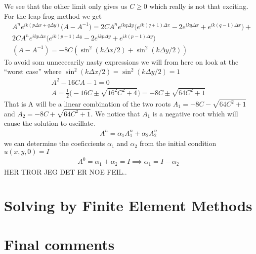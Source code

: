 \documentclass[a4paper,english, 10pt, twoside]{article}
\begin{document}
We see that the other limit only gives us $C\geq 0$ which really is not that exciting. \\
For the leap frog method we get
\begin{align*}
  &A^ne^{ik(p\Delta x +q\Delta y)}\big(A-A^{-1}\big) = 2CA^ne^{ikq\Delta y}\big(e^{ik(q+1)\Delta x} -2e^{ikq\Delta x}+
  e^{ik(q-1)\Delta x}\big)+\\
 &2CA^ne^{ikp\Delta x}\big(e^{ik(p+1)\Delta y} -2e^{ikp\Delta y} +e^{ik(p-1)\Delta y}\big) \\
 &(A-A^{-1}) = -8C(\sin^2(k\Delta x/2)+ \sin^2(k\Delta y/2))
\end{align*}
To avoid som unnececarily nasty expressions we will from here on look at the ``worst case'' where $\sin^2(k\Delta x/2) = 
\sin^2(k\Delta y/2) = 1$
\begin{align*}
 A^2 -16CA -1 = 0\\
 A = \frac{1}{2}\big(-16C \pm\sqrt{16^2C^2 +4}\big)  = -8C \pm\sqrt{64C^2+1}
\end{align*}
That is A will be a linear combination of the two roots $A_1 = -8C -\sqrt{64C^2+1}$ and $A_2 = -8C +\sqrt{64C^2+1}$.
We notice that $A_1$ is a negative root which will cause the solution to oscillate.
\begin{align*}
 A^n = \alpha_1A_1^n + \alpha_2A_2^n
\end{align*}
we can determine the coeficcients $\alpha_1$ and $\alpha_2$ from the initial condition $u(x,y,0) = I$
\begin{align*}
 A^0 = \alpha_1 + \alpha_2 = I \implies \alpha_1 = I-\alpha_2
\end{align*}
HER TROR JEG DET ER NOE FEIL..
\section{Solving by Finite Element Methods}
\section{Final comments}
\end{document}
